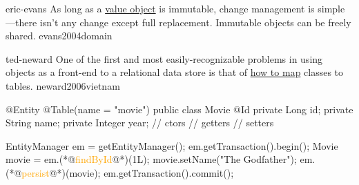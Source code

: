 \documentclass{article}
\begin{document}
\qte
  {eric-evans}
  {As long as a \ul{value object} is immutable, change management is simple---there isn't any change except full replacement. Immutable objects can be freely shared.}
  {evans2004domain}



\qte
  {ted-neward}
  {One of the first and most easily-recognizable problems in using objects as a front-end to a relational data store is that of \ul{how to map} classes to tables.}
  {neward2006vietnam}

\begin{pptWide}{2}
{\small\begin{ffcode}
@Entity
@Table(name = "movie")
public class Movie {
  @Id
  private Long id;
  private String name;
  private Integer year;
  // ctors
  // getters
  // setters
}
\end{ffcode}
}
\par\columnbreak\par
{\small\begin{ffcode}
EntityManager em = getEntityManager();
em.getTransaction().begin();
Movie movie = em.(*@\textcolor{orange}{findById}@*)(1L);
movie.setName("The Godfather");
em.(*@\textcolor{orange}{persist}@*)(movie);
em.getTransaction().commit();
\end{ffcode}
}
\end{pptWide}
\par
\plush{}
\end{document}
